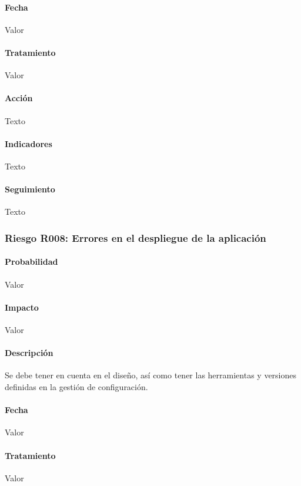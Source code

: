 \documentclass[10pt,a4paper]{article}
\begin{document}
				\paragraph{Fecha} Valor %
				\paragraph{Tratamiento} Valor %
				\paragraph{Acción} Texto %
				\paragraph{Indicadores} Texto %
				\paragraph{Seguimiento}	Texto %
				
				\subsubsection{Riesgo R008: Errores en el despliegue de la aplicación}
				\paragraph{Probabilidad} Valor
				\paragraph{Impacto}	Valor
				\paragraph{Descripción} Se debe tener en cuenta en el diseño, así como tener las herramientas y versiones definidas en la gestión de configuración.
				\paragraph{Fecha} Valor %
				\paragraph{Tratamiento} Valor %
\end{document}
